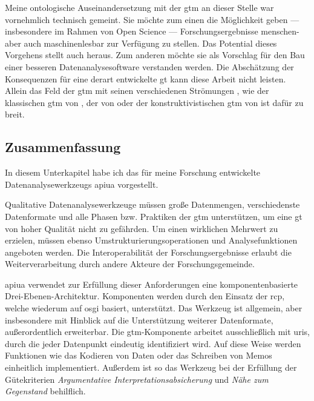 Meine ontologische Auseinandersetzung mit der \gls{gtm} an dieser Stelle war vornehmlich technisch gemeint. Sie möchte zum einen die Möglichkeit geben --- insbesondere im Rahmen von Open Science  --- Forschungsergebnisse menschen- aber auch maschinenlesbar zur Verfügung zu stellen. Das Potential dieses Vorgehens stellt auch \cite{MuhlmeyerMentzel:2011vs} heraus. Zum anderen möchte sie als Vorschlag für den Bau einer besseren Datenanalysesoftware verstanden werden. Die Abschätzung der Konsequenzen für eine derart entwickelte \gls{gt} kann diese Arbeit nicht leisten. Allein das Feld der \acrlong{gtm} mit seinen verschiedenen Strömungen \citep{Breckenridge:2012tf}, wie der klassischen \gls{gtm} von \cite{glaser1978theoretical}, der von \cite{strauss1990basics} oder der konstruktivistischen \gls{gtm} von \cite{charmaz2006constructing} ist dafür zu breit.



\subsection{Zusammenfassung}

In diesem Unterkapitel habe ich das für meine Forschung entwickelte Datenanalysewerkzeugs \gls{apiua} vorgestellt.

Qualitative Datenanalysewerkzeuge müssen große Datenmengen, verschiedenste Datenformate und alle Phasen bzw. Praktiken der \gls{gtm} unterstützen, um eine \gls{gt} von hoher Qualität nicht zu gefährden. Um einen wirklichen Mehrwert zu erzielen, müssen ebenso Umstrukturierungsoperationen und Analysefunktionen angeboten werden. Die Interoperabilität der Forschungsergebnisse erlaubt die Weiterverarbeitung durch andere Akteure der Forschungsgemeinde. 

\gls{apiua} verwendet zur Erfüllung dieser Anforderungen eine komponentenbasierte Drei-Ebenen-Architektur. Komponenten werden durch den Einsatz der \gls{rcp}, welche wiederum auf \gls{osgi} basiert, unterstützt. Das Werkzeug ist allgemein, aber insbesondere mit Hinblick auf die Unterstützung weiterer Datenformate, außerordentlich erweiterbar. Die \gls{gtm}-Komponente arbeitet ausschließlich mit \glspl{uri}, durch die jeder Datenpunkt eindeutig identifiziert wird. Auf diese Weise werden Funktionen wie das Kodieren von Daten oder das Schreiben von Memos einheitlich implementiert. Außerdem ist so das Werkzeug bei der Erfüllung der Gütekriterien \textit{Argumentative Interpretationsabsicherung} und \textit{Nähe zum Gegenstand} behilflich. 

